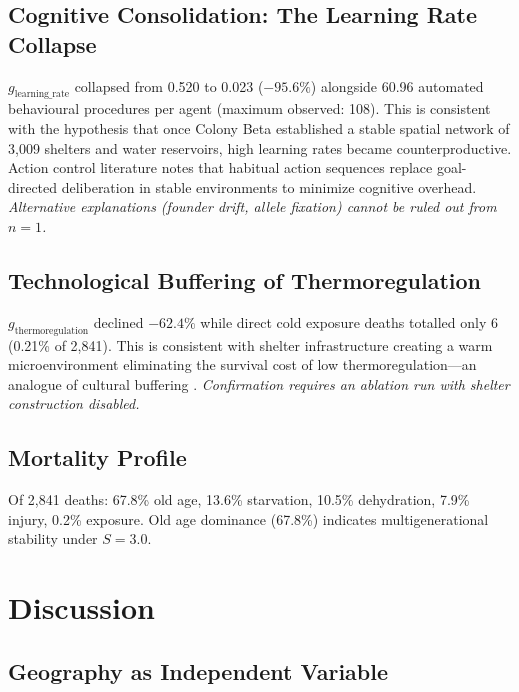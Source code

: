 \documentclass[12pt,a4paper]{article}
\begin{document}
\subsection{Cognitive Consolidation: The Learning Rate Collapse}
\label{sec:consolidation}

$g_{\text{learning\_rate}}$ collapsed from 0.520 to 0.023 ($-95.6\%$) alongside 60.96 automated behavioural procedures per agent (maximum observed: 108). This is consistent with the hypothesis that once Colony Beta established a stable spatial network of 3,009 shelters and water reservoirs, high learning rates became counterproductive. Action control literature \cite{balleine2010} notes that habitual action sequences replace goal-directed deliberation in stable environments to minimize cognitive overhead. \textit{Alternative explanations (founder drift, allele fixation) cannot be ruled out from $n{=}1$.}

\subsection{Technological Buffering of Thermoregulation}
\label{sec:buffering}

$g_{\text{thermoregulation}}$ declined $-62.4\%$ while direct cold exposure deaths totalled only 6 (0.21\% of 2,841). This is consistent with shelter infrastructure creating a warm microenvironment eliminating the survival cost of low thermoregulation---an analogue of cultural buffering \cite{laland2000}. \textit{Confirmation requires an ablation run with shelter construction disabled.}

\subsection{Mortality Profile}

Of 2,841 deaths: 67.8\% old age, 13.6\% starvation, 10.5\% dehydration, 7.9\% injury, 0.2\% exposure. Old age dominance (67.8\%) indicates multigenerational stability under $S{=}3.0$.

\section{Discussion}

\subsection{Geography as Independent Variable}
\end{document}
